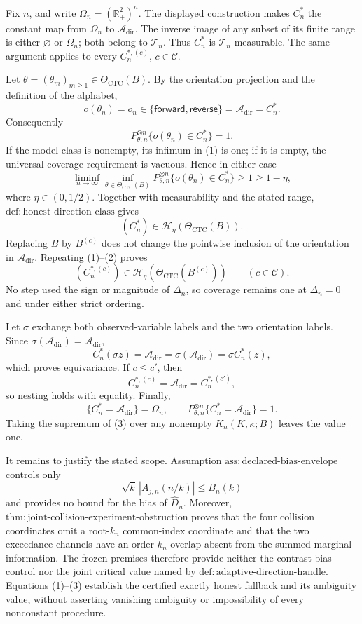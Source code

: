 Fix \(n\), and write \(\Omega_n=(\mathbb R_+^2)^n\).  The displayed construction makes \(C_n^*\) the constant map from \(\Omega_n\) to \(\mathcal A_{\mathrm{dir}}\).  The inverse image of any subset of its finite range is either \(\varnothing\) or \(\Omega_n\); both belong to \(\mathcal T_n\).  Thus \(C_n^*\) is \(\mathcal T_n\)-measurable.  The same argument applies to every \(C_n^{*,(c)}\), \(c\in\mathcal C\).

Let \(\theta=(\theta_m)_{m\geq1}\in\Theta_{\mathrm{CTC}}(B)\).  By the orientation projection and the definition of the alphabet,
\[
 o(\theta_n)=o_n\in\{\mathsf{forward},\mathsf{reverse}\}
 =\mathcal A_{\mathrm{dir}}=C_n^*.
\]
Consequently
\[
 P_{\theta,n}^{\otimes n}\{o(\theta_n)\in C_n^*\}=1. \tag{1}
\]
If the model class is nonempty, its infimum in (1) is one; if it is empty, the universal coverage requirement is vacuous.  Hence in either case
\[
 \liminf_{n\to\infty}\inf_{\theta\in\Theta_{\mathrm{CTC}}(B)}
 P_{\theta,n}^{\otimes n}\{o(\theta_n)\in C_n^*\}
 \geq1\geq1-\eta,
\]
where \(\eta\in(0,1/2)\).  Together with measurability and the stated range, \(\mathrm{def{:}honest\text{-}direction\text{-}class}\) gives
\[
 (C_n^*)\in\mathcal H_\eta(\Theta_{\mathrm{CTC}}(B)). \tag{2}
\]
Replacing \(B\) by \(B^{(c)}\) does not change the pointwise inclusion of the orientation in \(\mathcal A_{\mathrm{dir}}\).  Repeating (1)--(2) proves
\[
 (C_n^{*,(c)})\in\mathcal H_\eta(\Theta_{\mathrm{CTC}}(B^{(c)}))
 \qquad(c\in\mathcal C).
\]
No step used the sign or magnitude of \(\Delta_n\), so coverage remains one at \(\Delta_n=0\) and under either strict ordering.

Let \(\sigma\) exchange both observed-variable labels and the two orientation labels.  Since \(\sigma(\mathcal A_{\mathrm{dir}})=\mathcal A_{\mathrm{dir}}\),
\[
 C_n^*(\sigma z)=\mathcal A_{\mathrm{dir}}
 =\sigma(\mathcal A_{\mathrm{dir}})=\sigma C_n^*(z),
\]
which proves equivariance.  If \(c\leq c'\), then
\[
 C_n^{*,(c)}=\mathcal A_{\mathrm{dir}}=C_n^{*,(c')},
\]
so nesting holds with equality.  Finally,
\[
 \{C_n^*=\mathcal A_{\mathrm{dir}}\}=\Omega_n,
 \qquad
 P_{\theta,n}^{\otimes n}\{C_n^*=\mathcal A_{\mathrm{dir}}\}=1. \tag{3}
\]
Taking the supremum of (3) over any nonempty \(K_n(K,\kappa;B)\) leaves the value one.

It remains to justify the stated scope.  Assumption \(\mathrm{ass{:}declared\text{-}bias\text{-}envelope}\) controls only
\[
 \sqrt{k}\,|A_{j,n}(n/k)|\leq B_n(k)
\]
and provides no bound for the bias of \(\widehat D_n\).  Moreover, \(\mathrm{thm{:}joint\text{-}collision\text{-}experiment\text{-}obstruction}\) proves that the four collision coordinates omit a root-\(k_n\) common-index coordinate and that the two exceedance channels have an order-\(k_n\) overlap absent from the summed marginal information.  The frozen premises therefore provide neither the contrast-bias control nor the joint critical value named by \(\mathrm{def{:}adaptive\text{-}direction\text{-}handle}\).  Equations (1)--(3) establish the certified exactly honest fallback and its ambiguity value, without asserting vanishing ambiguity or impossibility of every nonconstant procedure.